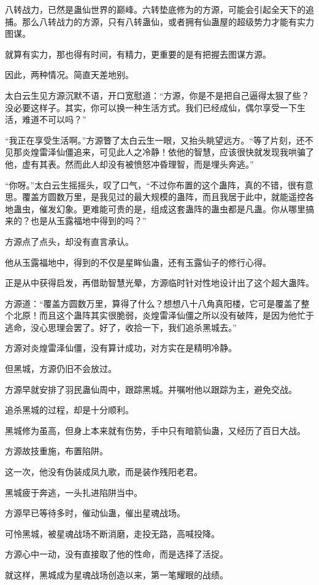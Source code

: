 \begin{this_body}
八转战力，已然是蛊仙世界的巅峰。六转垫底修为的方源，可能会引起全天下的追捕。那么八转战力的方源，只有八转蛊仙，或者拥有仙蛊屋的超级势力才能有实力图谋。

就算有实力，那也得有时间，有精力，更重要的是有把握去图谋方源。

因此，两种情况。简直天差地别。

太白云生见方源沉默不语，开口宽慰道：“方源，你是不是把自己逼得太狠了些？没必要这样子。其实，你可以换一种生活方式。我们已经成仙，偶尔享受一下生活，难道不可以吗？”

“我正在享受生活啊。”方源瞥了太白云生一眼，又抬头眺望远方。“等了片刻，还不见那炎煌雷泽仙僵追来，可见此人之冷静！依他的智慧，应该很快就发现我哄骗了他，虚有其表。然而此人却没有被愤怒冲昏理智，而是埋头奔逃。”

“你呀。”太白云生摇摇头，叹了口气，“不过你布置的这个蛊阵，真的不错，很有意思。覆盖方圆数万里，是我见过的最大规模的蛊阵，而且我居于此中，就能遥控各地蛊虫，催发幻象。更难能可贵的是，组成这套蛊阵的蛊虫都是凡蛊。你从哪里搞来的？也是从玉露福地中得到的吗？”

方源点了点头，却没有直言承认。

他从玉露福地中，得到的不仅是星眸仙蛊，还有玉露仙子的修行心得。

正是从中获得启发，再借助智慧光晕，方源临时针对性地设计出了这个超大蛊阵。

方源道：“覆盖方圆数万里，算得了什么？想想八十八角真阳楼，它可是覆盖了整个北原！而且这个蛊阵其实很脆弱，炎煌雷泽仙僵之所以没有破阵，是因为他忙于逃命，没心思理会罢了。好了，收拾一下，我们追杀黑城去。”

方源对炎煌雷泽仙僵，没有算计成功，对方实在是精明冷静。

但黑城，方源仍旧不会放过。

方源早就安排了羽民蛊仙周中，跟踪黑城。并嘱咐他以跟踪为主，避免交战。

追杀黑城的过程，却是十分顺利。

黑城修为虽高，但身上本来就有伤势，手中只有暗箭仙蛊，又经历了百日大战。

方源故技重施，布置陷阱。

这一次，他没有伪装成凤九歌，而是装作残阳老君。

黑城疲于奔逃，一头扎进陷阱当中。

方源早已等待多时，催动仙蛊，催出星魂战场。

可怜黑城，被星魂战场不断消磨，走投无路，高喊投降。

方源心中一动，没有直接取了他的性命，而是选择了活捉。

就这样，黑城成为星魂战场创造以来，第一笔耀眼的战绩。


\end{this_body}
